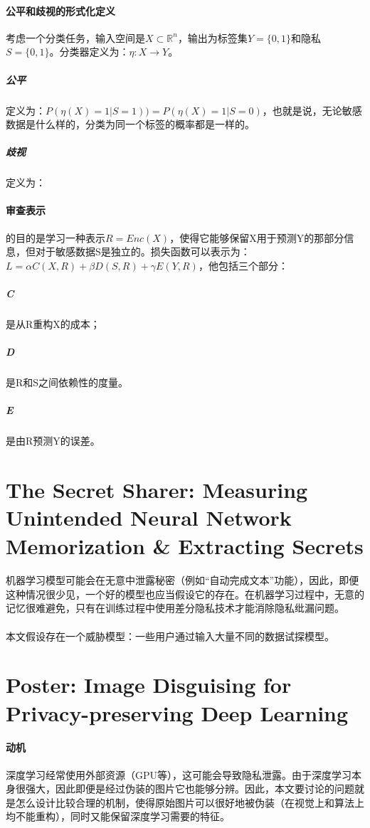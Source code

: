 \documentclass[12pt,a4paper]{article}
\begin{document}
\paragraph{公平和歧视的形式化定义} 考虑一个分类任务，输入空间是$X \subset \mathbb{R}^n$，输出为标签集$Y = \{0,1\}$和隐私$S=\{0,1\}$。分类器定义为：$\eta : X \rightarrow Y$。
	\subparagraph{公平} 定义为：$P(\eta(X)=1|S=1))=P(\eta(X)=1|S=0)$，也就是说，无论敏感数据是什么样的，分类为同一个标签的概率都是一样的。
	\subparagraph{歧视}定义为：
\paragraph{审查表示} 的目的是学习一种表示$R=Enc(X)$，使得它能够保留X用于预测Y的那部分信息，但对于敏感数据S是独立的。损失函数可以表示为：$L=\alpha C(X,R) + \beta D(S,R) + \gamma E(Y,R)$，他包括三个部分：
	\subparagraph{C} 是从R重构X的成本；
	\subparagraph{D} 是R和S之间依赖性的度量。
	\subparagraph{E} 是由R预测Y的误差。

\newpage
\section{The Secret Sharer: Measuring Unintended Neural Network Memorization \& Extracting Secrets\cite{secretsharer}}
\paragraph{} 机器学习模型可能会在无意中泄露秘密（例如“自动完成文本”功能），因此，即便这种情况很少见，一个好的模型也应当假设它的存在。在机器学习过程中，无意的记忆很难避免，只有在训练过程中使用差分隐私技术才能消除隐私纰漏问题。
\paragraph{} 本文假设存在一个威胁模型：一些用户通过输入大量不同的数据试探模型。

\newpage
\section{Poster: Image Disguising for Privacy-preserving Deep Learning\cite{imagedisguising}}

\paragraph{动机} 深度学习经常使用外部资源（GPU等），这可能会导致隐私泄露。由于深度学习本身很强大，因此即便是经过伪装的图片它也能够分辨。因此，本文要讨论的问题就是怎么设计比较合理的机制，使得原始图片可以很好地被伪装（在视觉上和算法上均不能重构），同时又能保留深度学习需要的特征。
\end{document}
